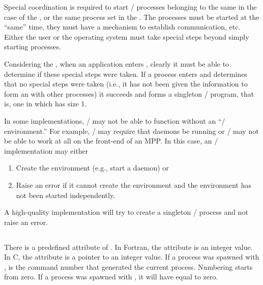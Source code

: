 \begin{implementors}
Special coordination is required to start \MPI/ processes belonging
to the same  in the case of the \wpm{},
or the same  process set in the \spm{}.
The processes
must be started at the ``same'' time, they must
have a mechanism to establish communication, etc.
Either the user or the operating system must take special
steps beyond simply starting processes.

Considering the \wpm{}, when
an application enters , clearly
it must be able to determine if these special steps
were taken.
If a process enters  and determines
that no special steps were taken (i.e., it has not been given
the information to form an 
with other processes) it succeeds and forms
a singleton \MPI/ program, that is, one in which
 has size 1.

In some implementations, \MPI/ may not be able to
function without an ``\MPI/ environment.'' For example,
\MPI/ may require that daemons be running or \MPI/
may not be able to work at all on the front-end
of an MPP. In this case, an \MPI/ implementation may
either
\begin{enumerate}
\item Create the environment (e.g., start a daemon) or
\item Raise an error if it cannot create the environment
and the environment has not been started independently.
\end{enumerate}
A high-quality implementation will try to create
a singleton \MPI/ process and not raise an error.\end{implementors}


\subsection{\texorpdfstring{}{MPI\_APPNUM}}

There is a predefined attribute 
of . In Fortran, the attribute
is an integer value. In C, the attribute is a
pointer to an integer value.
If a process was spawned
with ,
 is the command number that generated
the current process. Numbering starts from zero.
If a process was spawned with ,
it will have 
equal to zero.

